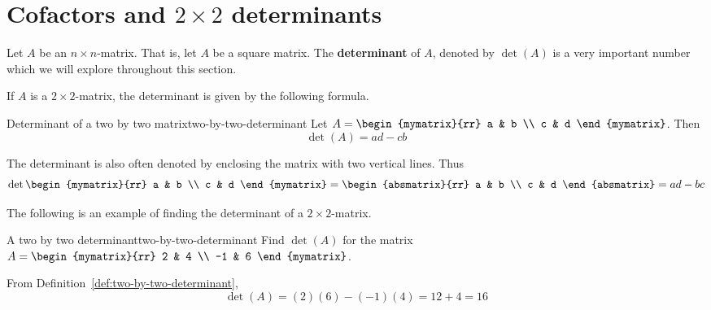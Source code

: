 \section{Cofactors and \texorpdfstring{$2\times 2$}{2x2} determinants}

Let $A$ be an $n\times n$-matrix. That is, let $A$ be a square
matrix. The \textbf{determinant} of $A$, denoted by
$\det(A)$ is a very important number which we will explore
throughout this section.

If $A$ is a $2\times 2$-matrix, the determinant is given by the
following formula.

\begin{definition}{Determinant of a two by two matrix}{two-by-two-determinant}
  Let $A=\begin{mymatrix}{rr}
    a & b \\
    c & d
  \end{mymatrix}$. Then
  \begin{equation*}
    \det(A) = ad-cb
  \end{equation*}
\end{definition}

The determinant is also often denoted by enclosing the matrix with two
vertical lines. Thus
\begin{equation*}
  \det \begin{mymatrix}{rr}
    a & b \\
    c & d
  \end{mymatrix} =\begin{absmatrix}{rr}
    a & b \\
    c & d
  \end{absmatrix} 
  =ad - bc
\end{equation*}

The following is an example of finding the determinant of a
$2 \times 2$-matrix.

\begin{example}{A two by two determinant}{two-by-two-determinant}
  Find $\det(A)$ for the matrix
  $A =  \begin{mymatrix}{rr}
    2 & 4 \\
    -1 & 6
  \end{mymatrix}$.
\end{example}

\begin{solution}
  From Definition~\ref{def:two-by-two-determinant},
  \begin{equation*}
    \det(A) = (2) (6) - (-1) (4) = 12 + 4 = 16
  \end{equation*}
\end{solution} 

